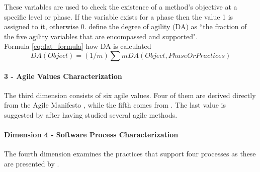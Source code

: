 These variables are used to check the existence of a method's objective at a specific level or phase. If the variable exists for a phase then the value 1 is assigned to it, otherwise 0. \citet{qumer2006measuring} define the degree of agility (DA) as ``the fraction of the five agility variables that are encompassed and supported".\\ %

Formula \eqref{eq:dat_formula} how DA is calculated\\
\begin{equation} \label{eq:dat_formula} DA (Object) = (1/m) \sum m DA(Object, Phase Or Practices) \end{equation}


\paragraph{3 - Agile Values Characterization}
The third dimension consists of six agile values. Four of them are derived directly from the Agile Manifesto \cite{beck2001agile}, while the fifth comes from \citet{koch2005agile}. The last value is suggested by \citet{qumer2006measuring} after having studied several agile methods. %


\paragraph{Dimension 4 - Software Process Characterization}
The fourth dimension examines the practices that support four processes as these are presented by \citet{qumer2006measuring}. %

